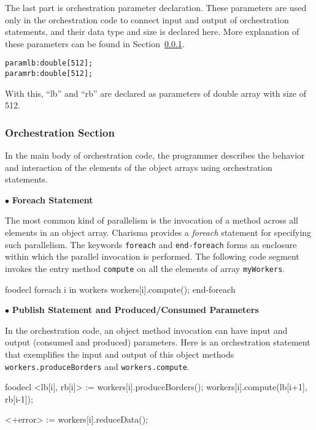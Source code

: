 \documentclass[10pt]{article}
\def\smallfbox#1{\small \fbox{#1}}
\def\code#1{{\small {\tt {#1}}}}
\begin{document}
The last part is orchestration parameter declaration. These parameters are used
only in the orchestration code to connect input and output of orchestration
statements, and their data type and size is declared here. More explanation of
these parameters can be found in Section~\ref{sec:orchsec}. 

\begin{alltt}
    param lb : double[512];
    param rb : double[512];
\end{alltt}

With this, ``lb'' and ``rb'' are declared as parameters of double array with
size of 512. 

\subsubsection{Orchestration Section}
\label{sec:orchsec}

In the main body of orchestration code, the programmer describes the behavior
and interaction of the elements of the object arrays using orchestration
statements.

$\bullet$ {\bf Foreach Statement}

The most common kind of parallelism is the invocation of a method
across all elements in an object array. Charisma provides a {\em foreach}
statement for specifying such parallelism. The keywords \code{foreach} and
\code{end-foreach} forms an enclosure within which the parallel invocation is
performed. The following code segment invokes the entry method \code{compute} on
all the elements of array \code{myWorkers}. 

\begin{SaveVerbatim}{foodecl}
    foreach i in workers
        workers[i].compute();
    end-foreach
\end{SaveVerbatim}
\vspace{0.1in}
\smallfbox{\BUseVerbatim{foodecl}}
\vspace{0.1in}

$\bullet$ {\bf Publish Statement and Produced/Consumed Parameters}

In the orchestration code, an object method invocation can have input and output
(consumed and produced) parameters. Here is an orchestration statement that
exemplifies the input and output of this object methods
\code{workers.produceBorders} and \code{workers.compute}. 

\begin{SaveVerbatim}{foodecl}
    <lb[i], rb[i]> := workers[i].produceBorders();
    workers[i].compute(lb[i+1], rb[i-1]);
    
    <+error> := workers[i].reduceData();
\end{SaveVerbatim}
\vspace{0.1in}
\smallfbox{\BUseVerbatim{foodecl}}
\vspace{0.1in}
\end{document}
